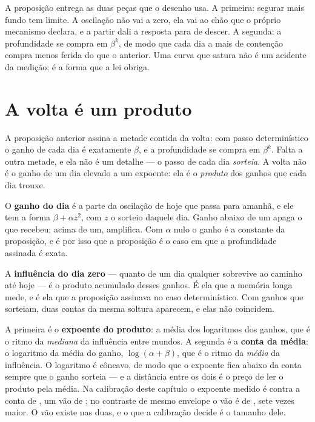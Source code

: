 A proposição entrega as duas peças que o desenho usa. A primeira: segurar mais fundo tem limite. A
oscilação não vai a zero, ela vai ao chão que o próprio mecanismo declara, e a partir dali a
resposta para de descer. A segunda: a profundidade se compra em $\beta^{k}$, de modo que cada dia a
mais de contenção compra menos ferida do que o anterior. Uma curva que satura não é um acidente da
medição; é a forma que a lei obriga.

\section{A volta é um produto}

A proposição anterior assina a metade contida da volta: com passo determinístico o ganho de cada
dia é exatamente $\beta$, e a profundidade se compra em $\beta^k$. Falta a outra metade, e ela não
é um detalhe --- o passo de cada dia \emph{sorteia}. A volta não é o ganho de um dia elevado a um
expoente: ela é o \emph{produto} dos ganhos que cada dia trouxe.

O \textbf{ganho do dia} é a parte da oscilação de hoje que passa para amanhã, e ele tem a forma
$\beta + \alpha z^2$, com $z$ o sorteio daquele dia. Ganho abaixo de um apaga o que recebeu;
acima de um, amplifica. Com $\alpha$ nulo o ganho é a constante da proposição, e é por isso que a
proposição é o caso em que a profundidade assinada é exata.

A \textbf{influência do dia zero} --- quanto de um dia qualquer sobrevive ao caminho até hoje --- é
o produto acumulado desses ganhos. É ela que a memória longa mede, e é ela que a proposição
assinava no caso determinístico. Com ganhos que sorteiam, duas contas da mesma soltura aparecem, e
elas não coincidem.

A primeira é o \textbf{expoente do produto}: a média dos logaritmos dos ganhos, que é o ritmo da
\emph{mediana} da influência entre mundos. A segunda é a \textbf{conta da média}: o logaritmo da
média do ganho, $\log(\alpha + \beta)$, que é o ritmo da \emph{média} da influência. O logaritmo é
côncavo, de modo que o expoente fica abaixo da conta sempre que o ganho sorteia --- e a distância
entre os dois é o preço de ler o produto pela média. Na calibração deste capítulo o expoente medido
é \numProdutoExpoenteCapitulo{} contra a conta de \numProdutoContaCapitulo{}, um vão de
\numProdutoVaoCapitulo; no contraste de mesmo envelope o vão é de \numProdutoVaoContraste, sete
vezes maior. O vão existe nas duas, e o que a calibração decide é o tamanho dele.

